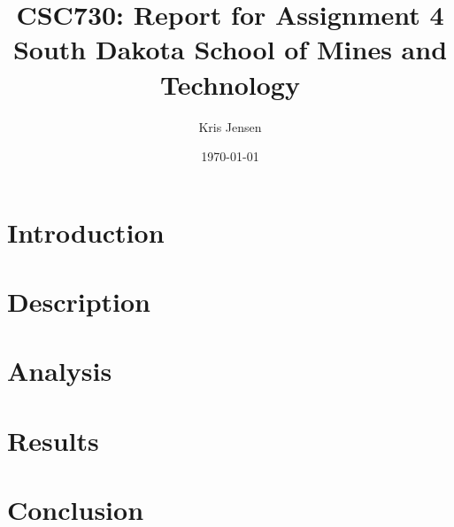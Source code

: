 \documentclass{article}
\begin{document}
\onecolumn %
\setlength{\droptitle}{-6em} 
\title{CSC730: Report for Assignment 4 \\ \large South Dakota School of Mines and Technology}
\author{Kris Jensen}

\date{\today}
\maketitle

\begin{multicols}{2} %
    \let\clearpage\relax
    \section{Introduction}
    
    
    \let\clearpage\relax
    \section{Description}
    

    \let\clearpage\relax
    \section{Analysis}
    

    \let\clearpage\relax
    \section{Results}
    

    \let\clearpage\relax
    \section{Conclusion}
    

\end{multicols}
\end{document}
